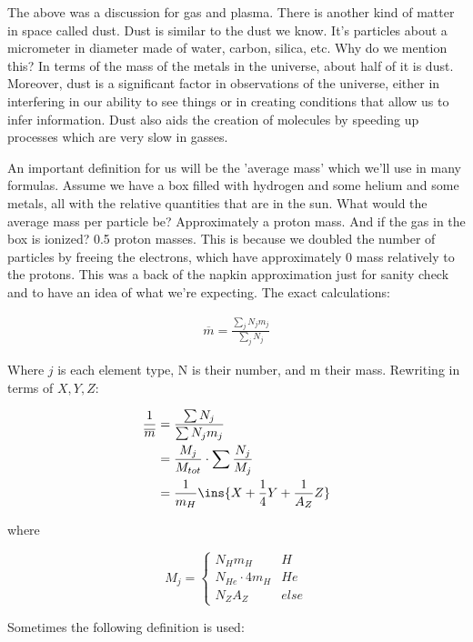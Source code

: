 The above was a discussion for gas and plasma. There is another kind of matter in space called dust. Dust is similar to the dust we know. It's particles about a micrometer in diameter made of water, carbon, silica, etc. Why do we mention this? In terms of the mass of the metals in the universe, about half of it is dust. Moreover, dust is a significant factor in observations of the universe, either in interfering in our ability to see things or in creating conditions that allow us to infer information. Dust also aids the creation of molecules by speeding up processes which are very slow in gasses.

An important definition for us will be the 'average mass' which we'll use in many formulas. Assume we have a box filled with hydrogen and some helium and some metals, all with the relative quantities that are in the sun. What would the average mass per particle be? Approximately a proton mass. And if the gas in the box is ionized? 0.5 proton masses. This is because we doubled the number of particles by freeing the electrons, which have approximately 0 mass relatively to the protons. This was a back of the napkin approximation just for sanity check and to have an idea of what we're expecting. The exact calculations:

\begin{align}
	\overline{m} = \frac{\sum\limits_j N_jm_j}{\sum\limits_j N_j}
\end{align}

Where $j$ is each element type, N is their number, and m their mass. Rewriting in terms of \(X,Y,Z\):

\begin{align}
	\frac{1}{\overline{m}} &= \frac{\sum N_j}{\sum N_jm_j}\\
	&= \frac{M_j}{M_{tot}}\cdot\sum\frac{N_j}{M_j}\\
	&= \frac{1}{m_H}\ins{X+\frac{1}{4}Y + \frac{1}{A_Z}Z}
\end{align}


where

\begin{equation}
	M_j = \begin{cases}
		N_Hm_H & H\\
		N_{He} \cdot 4m_H & He\\
		N_ZA_Z & else
	\end{cases}
\end{equation}

Sometimes the following definition is used:

